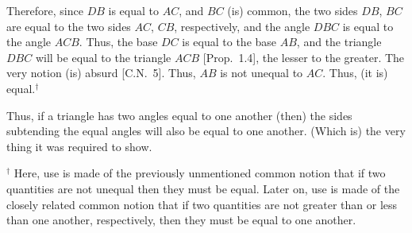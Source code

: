 \begin{Parallel}{}{}
{Therefore, since $DB$ is equal to $AC$, and $BC$ (is) common, the two sides $DB$, $BC$ are equal to the two sides $AC$, $CB$, respectively, and the angle $DBC$
is equal to the angle $ACB$. Thus, the base $DC$ is equal to the base
$AB$, and the triangle $DBC$ will be equal to the triangle $ACB$ [Prop.~1.4], the lesser
to the greater. The very notion (is) absurd [C.N.~5]. Thus, $AB$ is not unequal
to $AC$. Thus, (it is) equal.$^\dag$

Thus, if a triangle has two angles equal to one another (then) the sides subtending the
equal angles will also be equal to one another. (Which is) the very thing it was required to show.}
\end{Parallel}
{\footnotesize \noindent $^\dag$ Here, use is made of the previously
unmentioned common notion that if two quantities are not unequal then they must be equal. Later on, use is made of the closely related common notion
that if two quantities are not greater than or less than one another, respectively, then they must be equal to one another.}

